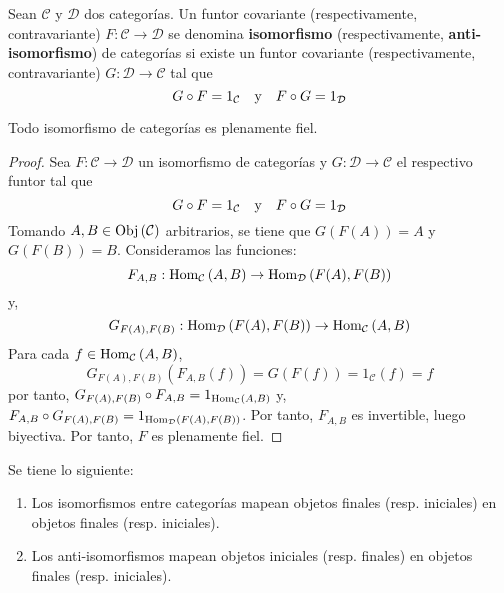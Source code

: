 \documentclass[12pt]{report}
\theoremstyle{largebreak}
\newcommand\cf[3]{\ensuremath{#1:#2\rightarrow#3}}
\newcommand{\Obj}[1]{\ensuremath{\textup{Obj}\left(#1\right)}}
\newcommand{\Hom}[3]{\ensuremath{\textup{Hom}_{#1}\left(#2,#3\right)}}
\begin{document}
    \renewcommand{\theenumi}{\arabic{enumi}}
    
    \begin{mydef}
        Sean $\mathcal{C}$ y $\mathcal{D}$ dos categorías. Un funtor covariante (respectivamente, contravariante) $\cf{F}{\mathcal{C}}{\mathcal{D}}$ se denomina \textbf{isomorfismo} (respectivamente, \textbf{anti-isomorfismo}) de categorías si existe un funtor covariante (respectivamente, contravariante) $\cf{G}{\mathcal{D}}{\mathcal{C}}$ tal que
        \begin{equation*}
            G\circ F=1_{\mathcal{C}}\quad\textup{y}\quad F\circ G=1_{\mathcal{D}}
        \end{equation*}
    \end{mydef}

    \begin{propo}
        Todo isomorfismo de categorías es plenamente fiel.
    \end{propo}

    \begin{proof}
        Sea $\cf{F}{\mathcal{C}}{\mathcal{D}}$ un isomorfismo de categorías y $\cf{G}{\mathcal{D}}{\mathcal{C}}$ el respectivo funtor tal que
        \begin{equation*}
            G\circ F=1_{\mathcal{C}}\quad\textup{y}\quad F\circ G=1_{\mathcal{D}}
        \end{equation*}
        Tomando $A,B\in\Obj{\mathcal{C}}$ arbitrarios, se tiene que $G(F(A))=A$ y $G(F(B))=B$. Consideramos las funciones:
        \begin{equation*}
            \cf{F_{A,B}}{\Hom{\mathcal{C}}{A}{B}}{\Hom{\mathcal{D}}{F(A)}{F(B)}}
        \end{equation*}
        y,
        \begin{equation*}
            \cf{G_{F(A),F(B)}}{\Hom{\mathcal{D}}{F(A)}{F(B)}}{\Hom{\mathcal{C}}{A}{B}}
        \end{equation*}
        Para cada $f\in \Hom{\mathcal{C}}{A}{B}$,
        \begin{equation*}
            G_{F(A),F(B)}(F_{A,B}(f))=G(F(f))=1_{\mathcal{C}}(f)=f
        \end{equation*}
        por tanto, $G_{F(A),F(B)}\circ F_{A,B}=1_{\Hom{\mathcal{C}}{A}{B}}$ y, $F_{A,B}\circ G_{F(A),F(B)}=1_{\Hom{\mathcal{D}}{F(A)}{F(B)}}$. Por tanto, $F_{A,B}$ es invertible, luego biyectiva. Por tanto, $F$ es plenamente fiel.
    \end{proof}

    \begin{cor}
        Se tiene lo siguiente:
        \begin{enumerate}
            \item Los isomorfismos entre categorías mapean objetos finales (resp. iniciales) en objetos finales (resp. iniciales).
            \item Los anti-isomorfismos mapean objetos iniciales (resp. finales) en objetos finales (resp. iniciales).
        \end{enumerate}
    \end{cor}
\end{document}
